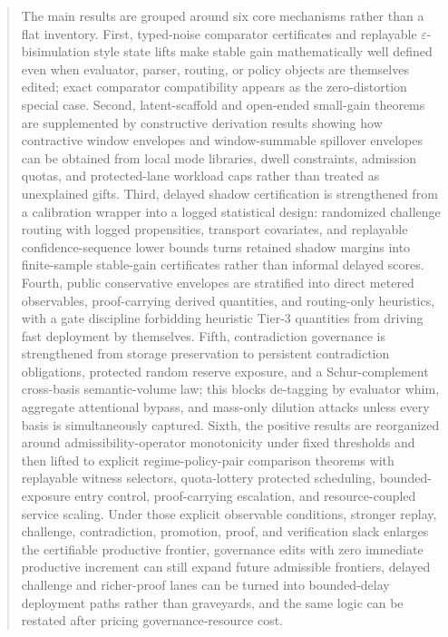 \documentclass[11pt]{article}
\theoremstyle{definition}
\newcommand{\1}{\mathbf{1}}
\begin{document}
\begin{abstract}
The main results are grouped around six core mechanisms rather than a flat inventory. First, typed-noise comparator certificates and replayable $\varepsilon$-bisimulation style state lifts make stable gain mathematically well defined even when evaluator, parser, routing, or policy objects are themselves edited; exact comparator compatibility appears as the zero-distortion special case. Second, latent-scaffold and open-ended small-gain theorems are supplemented by constructive derivation results showing how contractive window envelopes and window-summable spillover envelopes can be obtained from local mode libraries, dwell constraints, admission quotas, and protected-lane workload caps rather than treated as unexplained gifts. Third, delayed shadow certification is strengthened from a calibration wrapper into a logged statistical design: randomized challenge routing with logged propensities, transport covariates, and replayable confidence-sequence lower bounds turns retained shadow margins into finite-sample stable-gain certificates rather than informal delayed scores. Fourth, public conservative envelopes are stratified into direct metered observables, proof-carrying derived quantities, and routing-only heuristics, with a gate discipline forbidding heuristic Tier-3 quantities from driving fast deployment by themselves. Fifth, contradiction governance is strengthened from storage preservation to persistent contradiction obligations, protected random reserve exposure, and a Schur-complement cross-basis semantic-volume law; this blocks de-tagging by evaluator whim, aggregate attentional bypass, and mass-only dilution attacks unless every basis is simultaneously captured. Sixth, the positive results are reorganized around admissibility-operator monotonicity under fixed thresholds and then lifted to explicit regime-policy-pair comparison theorems with replayable witness selectors, quota-lottery protected scheduling, bounded-exposure entry control, proof-carrying escalation, and resource-coupled service scaling. Under those explicit observable conditions, stronger replay, challenge, contradiction, promotion, proof, and verification slack enlarges the certifiable productive frontier, governance edits with zero immediate productive increment can still expand future admissible frontiers, delayed challenge and richer-proof lanes can be turned into bounded-delay deployment paths rather than graveyards, and the same logic can be restated after pricing governance-resource cost.


\end{abstract}
\end{document}
